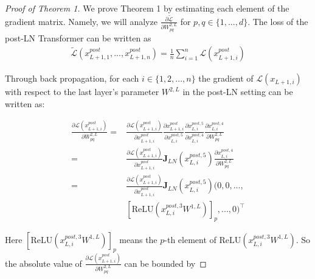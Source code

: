 \documentclass{article}
\begin{document}
\begin{proof}[Proof of Theorem 1]
We prove Theorem 1 by estimating each element of the gradient matrix. Namely, we will analyze $\frac{\partial \tilde{\mathcal{L}}}{\partial W^{2,L}_{pq}}$ for $p,q \in \{1,...,d\}$. The loss of the post-LN Transformer can be written as
\begin{align}
\tilde{\mathcal{L}}(x_{L+1,1}^{post},...,x_{L+1,n}^{post})=\frac{1}{n}\sum_{i=1}^n \mathcal{L}(x_{L+1,i}^{post})
\end{align}

Through back propagation, for each $i\in\{1,2,...,n\}$ the gradient of $\mathcal{L}(x_{L+1,i})$ with respect to the last layer's parameter $W^{2,L}$ in the post-LN setting can be written as:

\begin{align}
\frac{\partial \mathcal{L}(x_{L+1,i}^{post})}{\partial W^{2,L}_{pq}}=&\frac{\partial \mathcal{L}(x_{L+1,i}^{post})}{\partial x_{L+1,i}^{post}}\frac{\partial x_{L+1,i}^{post}}{\partial x_{L,i}^{post,5}}\frac{\partial x_{L,i}^{post,5}}{\partial x_{L,i}^{post,4}}\frac{\partial x_{L,i}^{post,4}}{\partial W^{2,L}_{pq}} \\
=&\frac{\partial \mathcal{L}(x_{L+1,i}^{post})}{\partial x_{L+1,i}^{post}}\mathbf{J}_{LN}(x_{L,i}^{post,5}) \frac{\partial x_{L,i}^{post,4}}{\partial W^{2,L}_{pq}}\\
=&\frac{\partial \mathcal{L}(x_{L+1,i}^{post})}{\partial x_{L+1,i}^{post}}\mathbf{J}_{LN}(x_{L,i}^{post,5})(0,0,...,\nonumber\\
&[\text{ReLU}(x_{L,i}^{post,3}W^{1,L})]_p,...,0)^{\top}
\end{align}

Here $[\text{ReLU}(x_{L,i}^{post,3}W^{1,L})]_p$ means the $p$-th element of $\text{ReLU}(x_{L,i}^{post,3}W^{1,L})$. So the absolute value of $\frac{\partial \mathcal{L}(x_{L+1,i}^{post})}{\partial W^{2,L}_{pq}}$ can be bounded by


\end{proof}
\end{document}
